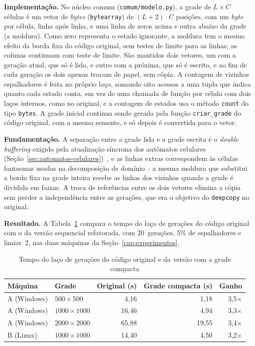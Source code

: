 \textbf{Implementação.} No núcleo comum (\texttt{comum/modelo.py}), a grade de $L \times C$ células é um vetor de \textit{bytes} (\texttt{bytearray}) de $(L+2) \cdot C$ posições, com um \textit{byte} por célula, linha após linha, e uma linha de zeros acima e outra abaixo da grade (a moldura). Como zero representa o estado ignorante, a moldura tem o mesmo efeito da borda fixa do código original, sem testes de limite para as linhas; as colunas continuam com teste de limite. São mantidos dois vetores, um com a geração atual, que só é lido, e outro com a próxima, que só é escrito, e ao fim de cada geração os dois apenas trocam de papel, sem cópia. A contagem de vizinhos espalhadores é feita no próprio laço, somando oito acessos a uma tupla que indica quanto cada estado conta, em vez de uma chamada de função por célula com dois laços internos, como no original, e a contagem de estados usa o método \texttt{count} do tipo \texttt{bytes}. A grade inicial continua sendo gerada pela função \texttt{criar\_grade} do código original, com a mesma semente, e só depois é convertida para o vetor.

\textbf{Fundamentação.} A separação entre a grade lida e a grade escrita é o \textit{double buffering} exigido pela atualização síncrona dos autômatos celulares (Seção~\ref{sec:automatos-celulares})~\cite{BertoTagliabue2023}, e as linhas extras correspondem às células fantasmas usadas na decomposição de domínio~\cite{Kjolstad2010}: a mesma moldura que substitui a borda fixa na grade inteira recebe as linhas dos vizinhos quando a grade é dividida em faixas. A troca de referências entre os dois vetores elimina a cópia sem perder a independência entre as gerações, que era o objetivo do \texttt{deepcopy} no original.

\textbf{Resultado.} A Tabela~\ref{tab:melhoria-grade} compara o tempo do laço de gerações do código original com o da versão sequencial refatorada, com 20~gerações, 5\% de espalhadores e limiar~2, nas duas máquinas da Seção~\ref{cap:experimentos}.

\begin{table}[htb]
    \centering
    \caption{Tempo do laço de gerações do código original e da versão com a grade compacta}
    \label{tab:melhoria-grade}
    \begin{tabular}{llrrr}
        \toprule
        \textbf{Máquina} & \textbf{Grade} & \textbf{Original (s)} & \textbf{Grade compacta (s)} & \textbf{Ganho} \\
        \midrule
        A (Windows) & $500 \times 500$   & 4,16  & 1,18  & 3,5$\times$ \\
        A (Windows) & $1000 \times 1000$ & 16,46 & 4,94  & 3,3$\times$ \\
        A (Windows) & $2000 \times 2000$ & 65,88 & 19,55 & 3,4$\times$ \\
        B (Linux)   & $1000 \times 1000$ & 14,40 & 4,50  & 3,2$\times$ \\
        \bottomrule
    \end{tabular}
    \fonte{}
\end{table}

